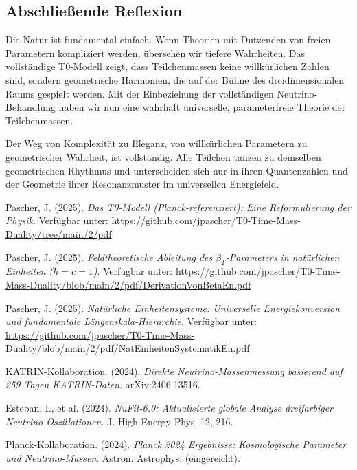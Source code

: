 \documentclass[12pt,a4paper]{article}
\begin{document}
	\subsection{Abschließende Reflexion}
	\label{subsec:final_reflection}
	
	Die Natur ist fundamental einfach. Wenn Theorien mit Dutzenden von freien Parametern kompliziert werden, übersehen wir tiefere Wahrheiten. Das vollständige T0-Modell zeigt, dass Teilchenmassen keine willkürlichen Zahlen sind, sondern geometrische Harmonien, die auf der Bühne des dreidimensionalen Raums gespielt werden. Mit der Einbeziehung der vollständigen Neutrino-Behandlung haben wir nun eine wahrhaft universelle, parameterfreie Theorie der Teilchenmassen.
	
	Der Weg von Komplexität zu Eleganz, von willkürlichen Parametern zu geometrischer Wahrheit, ist vollständig. Alle Teilchen tanzen zu demselben geometrischen Rhythmus und unterscheiden sich nur in ihren Quantenzahlen und der Geometrie ihrer Resonanzmuster im universellen Energiefeld.
	
	\newpage
	\begin{thebibliography}{99}
		Pascher, J. (2025). \textit{Das T0-Modell (Planck-referenziert): Eine Reformulierung der Physik}. Verfügbar unter: \url{https://github.com/jpascher/T0-Time-Mass-Duality/tree/main/2/pdf}
		
		Pascher, J. (2025). \textit{Feldtheoretische Ableitung des $\beta_T$-Parameters in natürlichen Einheiten ($\hbar = c = 1$)}. Verfügbar unter: \url{https://github.com/jpascher/T0-Time-Mass-Duality/blob/main/2/pdf/DerivationVonBetaEn.pdf}
		
		Pascher, J. (2025). \textit{Natürliche Einheitensysteme: Universelle Energiekonversion und fundamentale Längenskala-Hierarchie}. Verfügbar unter: \url{https://github.com/jpascher/T0-Time-Mass-Duality/blob/main/2/pdf/NatEinheitenSystematikEn.pdf}
		
		KATRIN-Kollaboration. (2024). \textit{Direkte Neutrino-Massenmessung basierend auf 259 Tagen KATRIN-Daten}. arXiv:2406.13516.
		
		Esteban, I., et al. (2024). \textit{NuFit-6.0: Aktualisierte globale Analyse dreifarbiger Neutrino-Oszillationen}. J. High Energy Phys. 12, 216.
		
		Planck-Kollaboration. (2024). \textit{Planck 2024 Ergebnisse: Kosmologische Parameter und Neutrino-Massen}. Astron. Astrophys. (eingereicht).
		
	\end{thebibliography}
	
\end{document}
